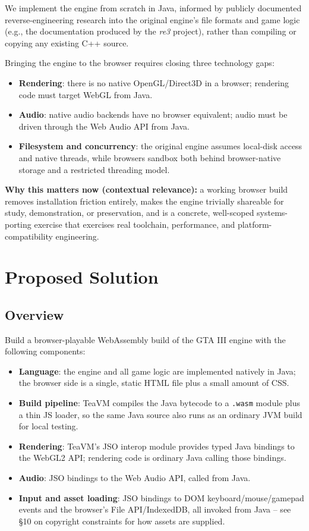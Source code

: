 \documentclass[11pt]{article}
\begin{document}
We implement the engine from scratch in Java, informed by publicly documented reverse-engineering research into the original engine's file formats and game logic (e.g., the documentation produced by the \emph{re3} project), rather than compiling or copying any existing C++ source.

Bringing the engine to the browser requires closing three technology gaps:
\begin{itemize}[itemsep=2pt]
  \item \textbf{Rendering}: there is no native OpenGL/Direct3D in a browser; rendering code must target WebGL from Java.
  \item \textbf{Audio}: native audio backends have no browser equivalent; audio must be driven through the Web Audio API from Java.
  \item \textbf{Filesystem and concurrency}: the original engine assumes local-disk access and native threads, while browsers sandbox both behind browser-native storage and a restricted threading model.
\end{itemize}

\textbf{Why this matters now (contextual relevance):} a working browser build removes installation friction entirely, makes the engine trivially shareable for study, demonstration, or preservation, and is a concrete, well-scoped systems-porting exercise that exercises real toolchain, performance, and platform-compatibility engineering.

\section{Proposed Solution}

\subsection{Overview}
Build a browser-playable WebAssembly build of the GTA III engine with the following components:
\begin{itemize}[itemsep=2pt]
  \item \textbf{Language}: the engine and all game logic are implemented natively in Java; the browser side is a single, static HTML file plus a small amount of CSS.
  \item \textbf{Build pipeline}: TeaVM compiles the Java bytecode to a \texttt{.wasm} module plus a thin JS loader, so the same Java source also runs as an ordinary JVM build for local testing.
  \item \textbf{Rendering}: TeaVM's JSO interop module provides typed Java bindings to the WebGL2 API; rendering code is ordinary Java calling those bindings.
  \item \textbf{Audio}: JSO bindings to the Web Audio API, called from Java.
  \item \textbf{Input and asset loading}: JSO bindings to DOM keyboard/mouse/gamepad events and the browser's File API/IndexedDB, all invoked from Java -- see \S10 on copyright constraints for how assets are supplied.
\end{itemize}
\end{document}
